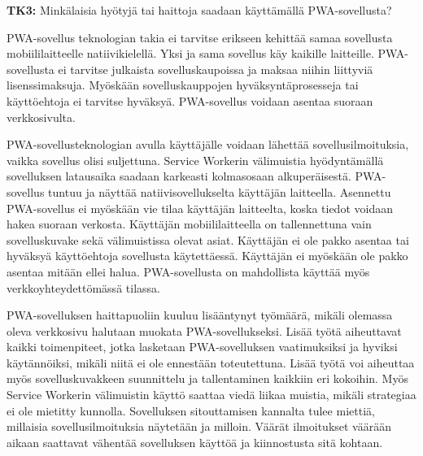 \documentclass{tktltiki}
\begin{document}
\textbf{TK3:} Minkälaisia hyötyjä tai haittoja saadaan käyttämällä PWA-sovellusta?

PWA-sovellus teknologian takia ei tarvitse erikseen kehittää samaa sovellusta mobiililaitteelle natiivikielellä. Yksi ja sama sovellus käy kaikille laitteille. PWA-sovellusta ei tarvitse julkaista sovelluskaupoissa ja maksaa niihin liittyviä lisenssimaksuja. Myöskään sovelluskauppojen hyväksyntäprosesseja tai käyttöehtoja ei tarvitse hyväksyä. PWA-sovellus voidaan asentaa suoraan verkkosivulta. 

PWA-sovellusteknologian avulla käyttäjälle voidaan lähettää sovellusilmoituksia, vaikka sovellus olisi suljettuna. Service Workerin välimuistia hyödyntämällä sovelluksen latausaika saadaan karkeasti kolmasosaan alkuperäisestä. PWA-sovellus tuntuu ja näyttää natiivisovellukselta käyttäjän laitteella. Asennettu PWA-sovellus ei myöskään vie tilaa käyttäjän laitteelta, koska tiedot voidaan hakea suoraan verkosta. Käyttäjän mobiililaitteella on tallennettuna vain sovelluskuvake sekä välimuistissa olevat asiat. Käyttäjän ei ole pakko asentaa tai hyväksyä käyttöehtoja sovellusta käytettäessä. Käyttäjän ei myöskään ole pakko asentaa mitään ellei halua. PWA-sovellusta on mahdollista käyttää myös verkkoyhteydettömässä tilassa.

PWA-sovelluksen haittapuoliin kuuluu lisääntynyt työmäärä, mikäli olemassa oleva verkkosivu halutaan muokata PWA-sovellukseksi. Lisää työtä aiheuttavat kaikki toimenpiteet, jotka lasketaan PWA-sovelluksen vaatimuksiksi ja hyviksi käytännöiksi, mikäli niitä ei ole ennestään toteutettuna. Lisää työtä voi aiheuttaa myös sovelluskuvakkeen suunnittelu ja tallentaminen kaikkiin eri kokoihin. Myös Service Workerin välimuistin käyttö saattaa viedä liikaa muistia, mikäli strategiaa ei ole mietitty kunnolla. Sovelluksen sitouttamisen kannalta tulee miettiä, millaisia sovellusilmoituksia näytetään ja milloin. Väärät ilmoitukset väärään aikaan saattavat vähentää sovelluksen käyttöä ja kiinnostusta sitä kohtaan.





%
%


%

\clearpage


\lastpage

\appendices
\end{document}
